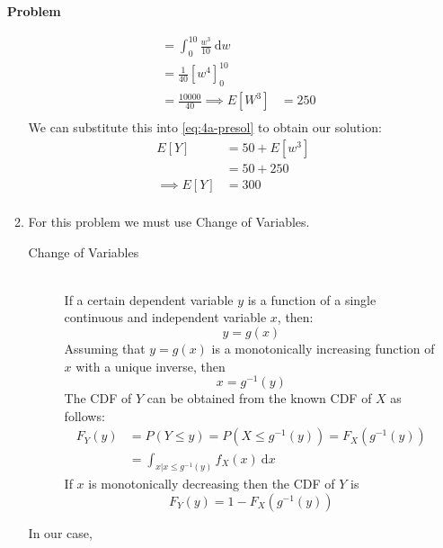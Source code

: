 \documentclass[12pt]{article}
\newenvironment{Ex}{\textbf{Problem}\vspace{.75em}\\}{}
\newcommand{\dd}[1]{\:\mathrm{d}{#1}}
\begin{document}
\begin{enumerate}
\begin{Ex}
\begin{solution}
\begin{enumerate}
\begin{equation}
\begin{aligned}
            &= \int_{0}^{10}\frac{w^3}{10} \dd{w} \\
            &= \frac{1}{40} [w^4]_{0}^{10} \\
            &= \frac{10000}{40}
            \implies E[W^3] &= 250 \\
          \end{aligned}
        \end{equation}
        We can substitute this into \cref{eq:4a-presol} to obtain our
        solution:
        \begin{equation}
          \label{eq:4a-sol}
          \begin{aligned}
            E[Y] &= 50 + E[w^3] \\
            &= 50 + 250 \\
            \implies E[Y] &= 300 \\
          \end{aligned}
        \end{equation}
      \item For this problem we must use Change of Variables.
        \begin{mdframed}[backgroundcolor=silver]
          \begin{description}
          \item[Change of Variables] \hfill \vspace{.75em} \\
            If a certain dependent variable $y$ is a function of a
            single continuous and independent variable $x$, then:
            $$y = g(x)$$
            Assuming that $y=g(x)$ is a monotonically increasing
            function of $x$ with a unique inverse, then
            $$x=g^{-1}(y)$$
            The CDF of $Y$ can be obtained from the known CDF of $X$ as
            follows:
            \begin{equation*}
              \begin{aligned}
                F_Y(y) &= P(Y\le y) = P(X \le g^{-1}(y)) =
                F_X(g^{-1}(y)) \\
                &= \int_{x|x\le g^{-1}(y)} f_X(x) \dd{x}
              \end{aligned}
            \end{equation*}
            If $x$ is monotonically decreasing then the CDF of $Y$ is
            $$F_Y(y) = 1 - F_X(g^{-1}(y))$$
          \end{description}
        \end{mdframed}
        In our case,
        \begin{equation}

\end{equation}
\end{enumerate}
\end{solution}
\end{Ex}
\end{enumerate}
\end{document}
